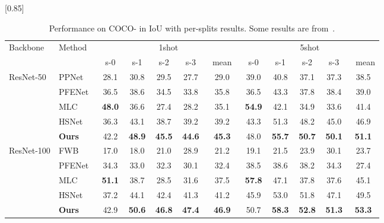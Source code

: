 \documentclass[runningheads]{llncs}
\begin{document}
\begin{table}[htb]
\centering
\caption{
   Performance on COCO- in IoU with per-splits results. Some results are from~\cite{PPNet, PFENet, MLC, HSNet}. 
   }
   \label{tb:coco}
  \scalebox{0.85}[0.85]{ 
  \begin{tabular}{l|l|ccccc|ccccc} \toprule

    \multirow{2}{*}{Backbone} & \multirow{2}{*}{Method} & \multicolumn{5}{|c|}{1shot} & \multicolumn{5}{|c}{5shot} \\  
    
     & &\, s-0 \,  &\, s-1 \, &\, s-2 \, &\, s-3 \, &\, mean \, &\, s-0 \, &\, s-1 \, &\, s-2 \, &\, s-3 \, &\, mean  \\  \midrule
    
    \multirow{5}{*}{ResNet-50}
    & PPNet~\cite{PPNet} 
    &28.1&30.8&29.5&27.7&29.0&39.0&40.8&37.1&37.3&38.5 \\
    
    & PFENet~\cite{PFENet} 
    &36.5&38.6&34.5&33.8&35.8&36.5&43.3&37.8&38.4&39.0 \\
    
    & MLC~\cite{MLC}    
    &\textbf{48.0}&36.6&27.4&28.2&35.1&\textbf{54.9}&42.1&34.9&33.6&41.4 \\
    
    & HSNet~\cite{HSNet}    
    &36.3&43.1&38.7&39.2&39.2&43.3&51.3&48.2&45.0&46.9 \\

    & \textbf{Ours} &42.2&\textbf{48.9}&\textbf{45.5}&\textbf{44.6}&\textbf{45.3}&48.0&\textbf{55.7}&\textbf{50.7}&\textbf{50.1}&\textbf{51.1}\\    


    \hline \midrule
    \multirow{5}{*}{ResNet-100} 
    &FWB~\cite{FWB}
    &17.0&18.0&21.0&28.9&21.2&19.1&21.5&23.9&30.1&23.7 \\
    
    & PFENet~\cite{PFENet} 
    &34.3&33.0&32.3&30.1&32.4&38.5&38.6&38.2&34.3&27.4 \\
    
    & MLC~\cite{MLC}    
    &\textbf{51.1}&38.7&28.5&31.6&37.5&\textbf{57.8}&47.1&37.8&37.6&45.1 \\
    
    & HSNet~\cite{HSNet}  
    &37.2&44.1&42.4&41.3&41.2&45.9&53.0&51.8&47.1&49.5 \\
    
    & \textbf{Ours} &42.9&\textbf{50.6}&\textbf{46.8}&\textbf{47.4}&\textbf{46.9}&50.7&\textbf{58.3}&\textbf{52.8}&\textbf{51.3}&\textbf{53.3}\\

    \bottomrule
    
  \end{tabular}
  }
\end{table}
\end{document}

